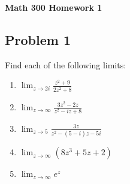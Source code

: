 \documentclass{article}
\begin{document}
\begin{center}
	{\bf Math 300 Homework 1}
\end{center}

\subsection*{Problem 1}
Find each of the following limits:
\begin{enumerate}
	\item $\displaystyle\lim_{z\to 2i} \frac{z^2+9}{2z^2+8}$
	\item $\displaystyle\lim_{z\to \infty} \frac{3z^2-2z}{z^2-iz+8}$
	\item $\displaystyle\lim_{z\to 5} \frac{3z}{z^2-(5-i)z-5i}$
	\item $\displaystyle\lim_{z\to \infty} (8z^3 + 5z + 2)$
	\item $\displaystyle\lim_{z\to \infty} e^z$
\end{enumerate}
\end{document}
